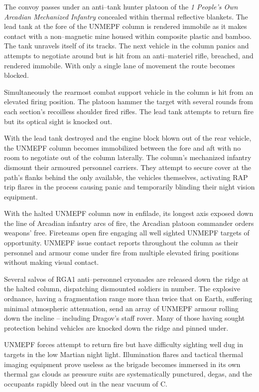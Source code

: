 The convoy passes under an anti--tank hunter platoon of the {\it 1 People's Own Arcadian Mechanized Infantry} concealed within thermal reflective blankets. The lead tank at the fore of the UNMEPF column is rendered immobile as it makes contact with a non--magnetic mine housed within composite plastic and bamboo. The tank unravels itself of its tracks. The next vehicle in the column panics and attempts to negotiate around but is hit from an anti--materiel rifle, breached, and rendered immobile. With only a single lane of movement the route becomes blocked.

Simultaneously the rearmost combat support vehicle in the column is hit from an elevated firing position. The platoon hammer the target with several rounds from each section's recoilless shoulder fired rifles. The lead tank attempts to return fire but its optical sight is knocked out.

With the lead tank destroyed and the engine block blown out of the rear vehicle, the UNMEPF column becomes immobilized between the fore and aft with no room to negotiate out of the column laterally. The column's mechanized infantry dismount their armoured personnel carriers. They attempt to secure cover at the path's flanks behind the only available, the vehicles themselves, activating RAP trip flares in the process causing panic and temporarily blinding their night vision equipment.

With the halted UNMEPF column now in enfilade, its longest axis exposed down the line of Arcadian infantry arcs of fire, the Arcadian platoon commander orders weapons' free. Fireteams open fire engaging all well sighted UNMEPF targets of opportunity. UNMEPF issue contact reports throughout the column as their personnel and armour come under fire from multiple elevated firing positions without making visual contact.

Several salvos of RGA1 anti--personnel cryonades are released down the ridge at the halted column, dispatching dismounted soldiers in number. The explosive ordnance, having a fragmentation range more than twice that on Earth, suffering minimal atmospheric attenuation, send an array of UNMEPF armour rolling down the incline -- including Dragov's staff rover. Many of those having sought protection behind vehicles are knocked down the ridge and pinned under.

UNMEPF forces attempt to return fire but have difficulty sighting well dug in targets in the low Martian night light. Illumination flares and tactical thermal imaging equipment prove useless as the brigade becomes immersed in its own thermal gas clouds as pressure suits are systematically punctured, degas, and the occupants rapidly bleed out in the near vacuum of C.

